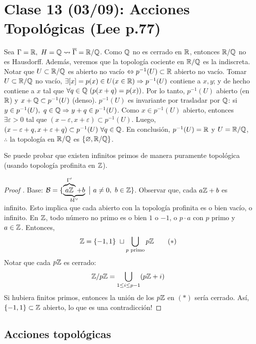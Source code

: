 \section{Clase 13 (03/09): Acciones Topológicas (Lee p.77)}

\begin{eg}
	Sea $\Gamma = \mathbb{R},\ H = \mathbb{Q} \leadsto \overline{\Gamma} = \mathbb{R} / \mathbb{Q}$. Como $\mathbb{Q}$ no es cerrado en $\mathbb{R}$, entonces $\mathbb{R} / \mathbb{Q}$ no es Hausdorff. Además, veremos que la topología cociente en $\mathbb{R} / \mathbb{Q}$ es la indiscreta. Notar que $U \subset \mathbb{R} / \mathbb{Q}$ es abierto no vacío $\Leftrightarrow p^{-1}(U) \subset \mathbb{R}$ abierto no vacío. Tomar $U \subset \mathbb{R} / \mathbb{Q}$ no vacío, $\exists [x] = p(x) \in U (x \in \mathbb{R}) \Rightarrow p^{-1}(U)$ contiene a $x,y$; y de hecho contiene a $x$ tal que $\forall q \in \mathbb{Q} \ (p(x+q) = p(x))$. Por lo tanto, $p^{-1}(U)$ abierto (en $\mathbb{R}$) y $x+\mathbb{Q} \subset p^{-1}(U)$ (denso). $p^{-1}(U)$ es invariante por trasladar por $\mathbb{Q}$: si $y \in p^{-1}(U),\ q \in \mathbb{Q} \Rightarrow y+q \in p^{-1}(U)$. Como $x \in p^{-1}(U)$ abierto, entonces $\exists \varepsilon > 0$ tal que $(x-\varepsilon, x + \varepsilon) \subset p^{-1}(U)$. Luego, $(x - \varepsilon + q, x + \varepsilon + q) \subset p^{-1}(U)\ \forall q \in \mathbb{Q}$. En conclusión, $p^{-1}(U) = \mathbb{R}$ y $U = \mathbb{R} / \mathbb{Q}$, $\therefore$ la topología en $\mathbb{R} / \mathbb{Q} $ es $\{ \varnothing, \mathbb{R} / \mathbb{Q} \}$.
\end{eg}

\begin{eg}[Furstenberg]
	Se puede probar que existen infinitos primos de manera puramente topológica (usando topología profinita en $\mathbb{Z}$).
\end{eg}
\begin{proof}[Proof ]
	Base: $\mathcal{B} = \{ \underbrace{\overbrace{a\mathbb{Z}}^{\Gamma'} + b}_{b\Gamma'} \ \big| \ a \neq 0,\ b \in \mathbb{Z} \}$. Observar que, cada $a\mathbb{Z} + b$ es infinito. Esto implica que cada abierto con la topología profinita es o bien vacío, o infinito. En $\mathbb{Z}$, todo número no primo es o bien $1$ o $-1$, o $p\cdot a$ con $p$ primo y $a \in \mathbb{Z}$. Entonces, 
	\[ \mathbb{Z} = \{-1,1\} \ \sqcup \bigcup_{p\text{ primo}} p\mathbb{Z} \tag{$*$} \]
	Notar que cada $p\mathbb{Z}$ es cerrado:
	\[ \mathbb{Z} / p\mathbb{Z} = \bigcup_{1 \leq i \leq p-1}(p\mathbb{Z} + i) \]
	Si hubiera finitos primos, entonces la unión de los $p\mathbb{Z}$ en $(*)$ sería cerrado. Así, $\{-1,1\} \subset \mathbb{Z}$ abierto, lo que es una contradicción! 
\end{proof}

\subsection*{Acciones topológicas}


